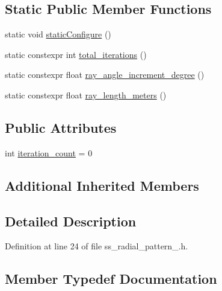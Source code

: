 \subsection*{Static Public Member Functions}
\begin{DoxyCompactItemize}
\item 
static void \hyperlink{structsm__dance__bot__3_1_1SS2_1_1SsRadialPattern2_af03f7d05eae72e178e01c38a0d478019}{static\+Configure} ()
\item 
static constexpr int \hyperlink{structsm__dance__bot__3_1_1SS2_1_1SsRadialPattern2_a5a4bca7f5c511a2b358f920c715fbdec}{total\+\_\+iterations} ()
\item 
static constexpr float \hyperlink{structsm__dance__bot__3_1_1SS2_1_1SsRadialPattern2_a3cb389428cdef48301135b562077f6aa}{ray\+\_\+angle\+\_\+increment\+\_\+degree} ()
\item 
static constexpr float \hyperlink{structsm__dance__bot__3_1_1SS2_1_1SsRadialPattern2_aad26eba03d611cdd4f842c2cf0eab644}{ray\+\_\+length\+\_\+meters} ()
\end{DoxyCompactItemize}
\subsection*{Public Attributes}
\begin{DoxyCompactItemize}
\item 
int \hyperlink{structsm__dance__bot__3_1_1SS2_1_1SsRadialPattern2_ae214d5caeae81f505b2b41e4d6427cd3}{iteration\+\_\+count} = 0
\end{DoxyCompactItemize}
\subsection*{Additional Inherited Members}


\subsection{Detailed Description}


Definition at line 24 of file ss\+\_\+radial\+\_\+pattern\+\_.\+h.



\subsection{Member Typedef Documentation}
